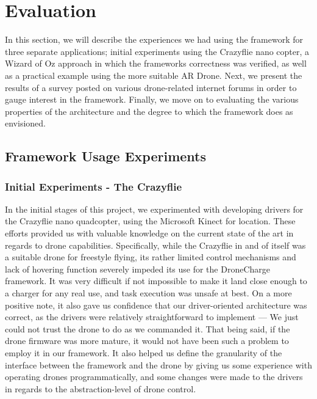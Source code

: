 \section{Evaluation}
In this section, we will describe the experiences we had using the framework for three separate applications; initial experiments using the Crazyflie nano copter, a Wizard of Oz approach in which the frameworks correctness was verified, as well as a practical example using the more suitable AR Drone. Next, we present the results of a survey posted on various drone-related internet forums in order to gauge interest in the framework. Finally, we move on to evaluating the various properties of the architecture and the degree to which the framework does as envisioned.

\subsection{Framework Usage Experiments}
\subsubsection{Initial Experiments - The Crazyflie}
In the initial stages of this project, we experimented with developing drivers for the Crazyflie nano quadcopter, using the Microsoft Kinect for location. These efforts provided us with valuable knowledge on the current state of the art in regards to drone capabilities. Specifically, while the Crazyflie in and of itself was a suitable drone for freestyle flying, its rather limited control mechanisms and lack of hovering function severely impeded its use for the DroneCharge framework. It was very difficult if not impossible to make it land close enough to a charger for any real use, and task execution was unsafe at best. On a more positive note, it also gave us confidence that our driver-oriented architecture was correct, as the drivers were relatively straightforward to implement --- We just could not trust the drone to do as we commanded it. That being said, if the drone firmware was more mature, it would not have been such a problem to employ it in our framework. It also helped us define the granularity of the interface between the framework and the drone by giving us some experience with operating drones programmatically, and some changes were made to the drivers in regards to the abstraction-level of drone control.

